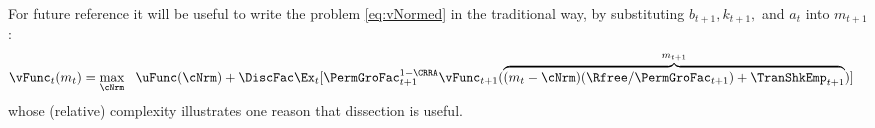 For future reference it will be useful to write the problem \eqref{eq:vNormed} in the traditional way, by substituting ${b}_{t+1},{k}_{t+1},$ and ${a}_{t}$ into ${m}_{t+1}$:
\begin{equation}\begin{gathered}\begin{aligned}
      {\vFunc}_{t}({m}_{t}) & = \max_{\cNrm} ~~ \uFunc(\cNrm)+
      {\DiscFac}\Ex_{t}[ \PermGroFac_{t+1}^{1-\CRRA}{\vFunc}_{t+1}(\overbrace{({m}_{t}-\cNrm)(\Rfree/\PermGroFac_{t+1})+\TranShkEmp_{t+1}}^{{m}_{t+1}})] \label{eq:vusual}
    \end{aligned}\end{gathered}\end{equation}
whose (relative) complexity illustrates one reason that dissection is useful.

